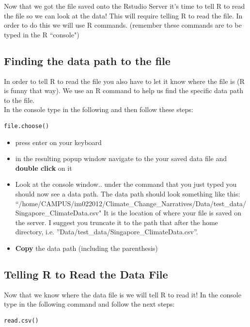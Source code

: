 \documentclass{article}\usepackage[]{graphicx}\usepackage[]{color}
\begin{document}
Now that we got the file saved onto the Rstudio Server it's time to tell R to read the file so we can look at the data! This will require telling R to read the file. In order to do this we will use R commands. (remember these commands are to be typed in the R ``console") %

 \subsection{Finding the data path to the file}
In order to tell R to read the file you also have to let it know where the file is (R is funny that way). We use an R command to help us find the specific data path to the file. \\
In the console type in the following and then follow these steps: 
\begin{verbatim}
file.choose()
\end{verbatim}

\begin{itemize} 
\item press enter on your keyboard
\item in the resulting popup window navigate to the your saved data file and \textbf{double click} on it
\item Look at the console window.. under the command that you just typed you should now see a data path. The data path should look something like this: ``/home/CAMPUS/im022012/Climate\_Change\_Narratives/Data/test\_data/Singapore\_ClimateData.csv"  It is the location of where your file is saved on the server. I suggest you truncate it to the path that after the home directory, i.e. ''Data/test\_data/Singapore\_ClimateData.csv''.

\item \textbf{Copy} the data path (including the parenthesis)
\end{itemize}

\subsection{Telling R to Read the Data File}

Now that we know where the data file is we will tell R to read it! In the console type in the following command and follow the next steps: 
\begin{verbatim}
read.csv()
\end{verbatim}
\end{document}
